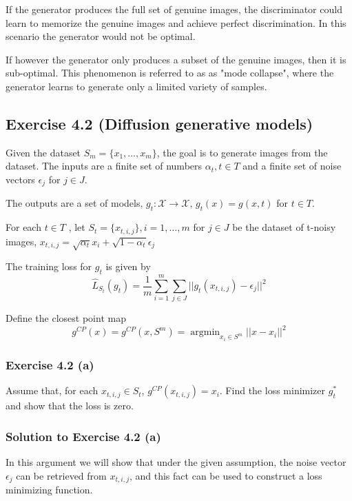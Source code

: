 \documentclass[
10pt, %
a4paper, %
oneside, %
headinclude,footinclude, %
BCOR5mm, %
]{scrartcl}
\DeclareMathOperator*{\argmin}{argmin} %
\begin{document}
If the generator produces the full set of genuine images, the discriminator could learn to memorize the genuine images and achieve perfect discrimination. In this scenario the generator would not be optimal.

If however the generator only produces a subset of the genuine images, then it is sub-optimal. This phenomenon is referred to as as "mode collapse", where the generator learns to generate only a limited variety of samples.

\newpage

\subsection*{Exercise 4.2 (Diffusion generative models)}
Given the dataset $S_m = \{x_1 , \ldots , x_m \}$, the goal is to generate images from the dataset. The inputs are a finite set of numbers $\alpha_t , t \in T$ and a finite set of noise vectors $\epsilon_j$ for $j \in J$.

The outputs are a set of models, $g_t : \mathcal{X} \rightarrow \mathcal{X}$, $g_t (x) = g(x, t)$ for $t \in T$.

For each $t \in T$ , let $S_t = \{x_{t,i,j}\}, i = 1, \ldots , m$ for $j \in J$ be the dataset of t-noisy images, $x_{t,i,j} = \sqrt{\alpha_t} x_i + \sqrt{1 - \alpha_t} \epsilon_j$

The training loss for $g_t$ is given by
\begin{equation*}
\hat{L}_{S_t}(g_t) = \frac{1}{m} \sum_{i=1}^{m} \sum_{j \in J} ||g_t (x_{t,i,j} ) - \epsilon_j ||^2
\end{equation*}

Define the closest point map
\begin{equation*}
  g^{CP}(x) = g^{CP}(x, S^m) = \argmin_{x_i \in S^m} ||x - x_i||^2
\end{equation*}

\subsubsection*{Exercise 4.2 (a)}
Assume that, for each $x_{t,i,j} \in S_t$, $g^{CP}(x_{t,i,j}) = x_i$. Find the loss minimizer $g^*_t$ and show that the loss is zero.

\subsubsection*{Solution to Exercise 4.2 (a)}
In this argument we will show that under the given assumption, the noise vector $\epsilon_j$ can be retrieved from $x_{t,i,j}$, and this fact can be used to construct a loss minimizing function.
\end{document}
